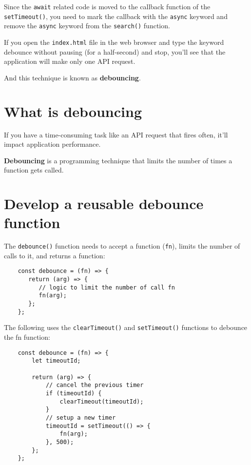 \documentclass[11pt]{article}
\begin{document}
\noindent
Since the \verb|await| related code is moved to the callback function of
the \verb|setTimeout()|, you need to mark the callback with the \verb|async| keyword
and remove the \verb|async| keyword from the \verb|search()| function.
\newline

\noindent
If you open the \verb|index.html| file in the web browser and type the keyword
debounce without pausing (for a half-second) and stop, you'll see
that the application will make only one API request.
\newline

\noindent
And this technique is known as \textbf{debouncing}.

\section*{What is debouncing}

If you have a time-consuming task like an API request that fires often,
it'll impact application performance.
\newline

\noindent
\textbf{Debouncing} is a programming technique that limits the number of
times a function gets called.

\section*{Develop a reusable debounce function}

The \verb|debounce()| function needs to accept a function (\verb|fn|), limits the
number of calls to it, and returns a function:

\begin{lstlisting}
    const debounce = (fn) => {
       return (arg) => {
          // logic to limit the number of call fn
          fn(arg);
       };
    };
\end{lstlisting}

\noindent
The following uses the \verb|clearTimeout()| and \verb|setTimeout()| functions
to debounce the fn function:

\begin{lstlisting}
    const debounce = (fn) => {
        let timeoutId;

        return (arg) => {
            // cancel the previous timer
            if (timeoutId) {
                clearTimeout(timeoutId);
            }
            // setup a new timer
            timeoutId = setTimeout(() => {
                fn(arg);
            }, 500);
        };
    };
\end{lstlisting}
\end{document}
